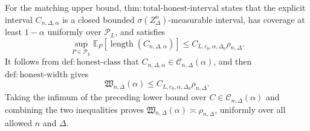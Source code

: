 For the matching upper bound, \(\mathrm{thm:total\text{-}honest\text{-}interval}\) states that the explicit interval \(C_{n,\Delta,\alpha}\) is a closed bounded \(\sigma(Z_\Delta^n)\)-measurable interval, has coverage at least \(1-\alpha\) uniformly over \(\mathcal P_L\), and satisfies
\[
 \sup_{P\in\mathcal P_L}
 \mathbb E_P[\operatorname{length}(C_{n,\Delta,\alpha})]
 \leq C_{L,c_0,\alpha,\Delta_0}\rho_{n,\Delta}.
\]
It follows from \(\mathrm{def:honest\text{-}class}\) that \(C_{n,\Delta,\alpha}\in\mathcal C_{n,\Delta}(\alpha)\), and then \(\mathrm{def:honest\text{-}width}\) gives
\[
 \mathfrak W_{n,\Delta}(\alpha)
 \leq C_{L,c_0,\alpha,\Delta_0}\rho_{n,\Delta}.
\]
Taking the infimum of the preceding lower bound over \(C\in\mathcal C_{n,\Delta}(\alpha)\) and combining the two inequalities proves \(\mathfrak W_{n,\Delta}(\alpha)\asymp\rho_{n,\Delta}\), uniformly over all allowed \(n\) and \(\Delta\).